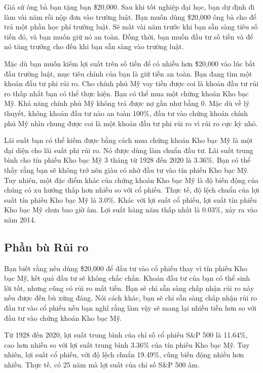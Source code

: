 Giả sử ông bà bạn tặng bạn \$20,000. Sau khi tốt nghiệp đại học, bạn dự định đi làm vài năm rồi nộp đơn vào trường luật. Bạn muốn dùng \$20,000 ông bà cho để trả một phần học phí trường luật. Sẽ mất vài năm trước khi bạn sẵn sàng tiêu số tiền đó, và bạn muốn giữ nó an toàn. Đồng thời, bạn muốn đầu tư số tiền và để nó tăng trưởng cho đến khi bạn sẵn sàng vào trường luật.

Mặc dù bạn muốn kiếm lợi suất trên số tiền để có nhiều hơn \$20,000 vào lúc bắt đầu trường luật, mục tiêu chính của bạn là giữ tiền an toàn. Bạn đang tìm một khoản đầu tư phi rủi ro. Cho chính phủ Mỹ vay tiền được coi là khoản đầu tư rủi ro thấp nhất bạn có thể thực hiện. Bạn có thể mua một chứng khoán Kho bạc Mỹ. Khả năng chính phủ Mỹ không trả được nợ gần như bằng 0. Mặc dù về lý thuyết, không khoản đầu tư nào an toàn 100\%, đầu tư vào chứng khoán chính phủ Mỹ nhìn chung được coi là một khoản đầu tư phi rủi ro vì rủi ro cực kỳ nhỏ.

Lãi suất bạn có thể kiếm được bằng cách mua chứng khoán Kho bạc Mỹ là một đại diện cho lãi suất phi rủi ro. Nó được dùng làm chuẩn đầu tư. Lãi suất trung bình cho tín phiếu Kho bạc Mỹ 3 tháng từ 1928 đến 2020 là 3.36\%. Bạn có thể thấy rằng bạn sẽ không trở nên giàu có nhờ đầu tư vào tín phiếu Kho bạc Mỹ. Tuy nhiên, một đặc điểm khác của chứng khoán Kho bạc Mỹ là độ biến động của chúng có xu hướng thấp hơn nhiều so với cổ phiếu. Thực tế, độ lệch chuẩn của lợi suất tín phiếu Kho bạc Mỹ là 3.0\%. Khác với lợi suất cổ phiếu, lợi suất tín phiếu Kho bạc Mỹ chưa bao giờ âm. Lợi suất hàng năm thấp nhất là 0.03\%, xảy ra vào năm 2014.

\subsection*{Phần bù Rủi ro}

Bạn biết rằng nếu dùng \$20,000 để đầu tư vào cổ phiếu thay vì tín phiếu Kho bạc Mỹ, kết quả đầu tư sẽ không chắc chắn. Khoản đầu tư của bạn có thể sinh lời tốt, nhưng cũng có rủi ro mất tiền. Bạn sẽ chỉ sẵn sàng chấp nhận rủi ro này nếu được đền bù xứng đáng. Nói cách khác, bạn sẽ chỉ sẵn sàng chấp nhận rủi ro đầu tư vào cổ phiếu nếu bạn nghĩ rằng làm vậy sẽ mang lại nhiều tiền hơn so với đầu tư vào chứng khoán Kho bạc Mỹ.

Từ 1928 đến 2020, lợi suất trung bình của chỉ số cổ phiếu S\&P 500 là 11.64\%, cao hơn nhiều so với lợi suất trung bình 3.36\% của tín phiếu Kho bạc Mỹ. Tuy nhiên, lợi suất cổ phiếu, với độ lệch chuẩn 19.49\%, cũng biến động nhiều hơn nhiều. Thực tế, có 25 năm mà lợi suất của chỉ số S\&P 500 âm.

